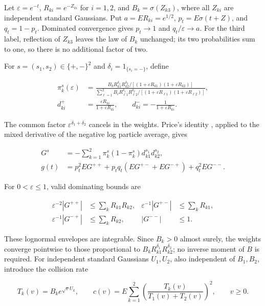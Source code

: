 \documentclass{article}
\begin{document}
Let \(\varepsilon=e^{-t}\), \(R_{ki}=e^{-Z_{ki}}\) for \(i=1,2\), and
\(B_k=\sigma(Z_{k3})\), where all \(Z_{ki}\) are independent standard
Gaussians. Put \(a=ER_{ki}=e^{1/2}\), \(p_t=E\sigma(t+Z)\), and
\(q_t=1-p_t\). Dominated convergence gives \(p_t\to1\) and
\(q_t/\varepsilon\to a\). For the third label, reflection of \(Z_{k3}\)
leaves the law of \(B_k\) unchanged; its two probabilities sum to one,
so there is no additional factor of two.

For \(s=(s_1,s_2)\in\{+,-\}^2\) and \(\delta_i=1_{\{s_i=-\}}\), define

\[
\begin{aligned}
\pi_k^s(\varepsilon)&=
\frac{B_kR_{k1}^{\delta_1}R_{k2}^{\delta_2}/[(1+\varepsilon R_{k1})(1+\varepsilon R_{k2})]}
{\sum_{\ell=1}^2B_\ell R_{\ell1}^{\delta_1}R_{\ell2}^{\delta_2}/[(1+\varepsilon R_{\ell1})(1+\varepsilon R_{\ell2})]},\\
d_{ki}^+&=\frac{\varepsilon R_{ki}}{1+\varepsilon R_{ki}},\qquad
 d_{ki}^-=-\frac1{1+\varepsilon R_{ki}}.
\end{aligned}
\tag{G.3}
\]

The common factor \(\varepsilon^{\delta_1+\delta_2}\) cancels in the
weights. Price's identity \citep{price1958}, applied to the mixed
derivative of the negative log particle average, gives

\[
\begin{aligned}
G^s&=-\sum_{k=1}^2\pi_k^s(1-\pi_k^s)d_{k1}^{s_1}d_{k2}^{s_2},\\
g(t)&=p_t^2EG^{++}+p_tq_t(EG^{+-}+EG^{-+})+q_t^2EG^{--}.
\end{aligned}
\tag{G.4}
\]

For \(0<\varepsilon\le1\), valid dominating bounds are

\[
\begin{aligned}
\varepsilon^{-2}|G^{++}|&\le\sum_kR_{k1}R_{k2},&
\varepsilon^{-1}|G^{+-}|&\le\sum_kR_{k1},\\
\varepsilon^{-1}|G^{-+}|&\le\sum_kR_{k2},&
|G^{--}|&\le1.
\end{aligned}
\tag{G.5}
\]

These lognormal envelopes are integrable. Since \(B_k>0\) almost surely,
the weights converge pointwise to those proportional to
\(B_kR_{k1}^{\delta_1}R_{k2}^{\delta_2}\); no inverse moment of \(B\) is
required. For independent standard Gaussians \(U_1,U_2\), also
independent of \(B_1,B_2\), introduce the collision rate

\[
T_k(v)=B_ke^{\sqrt vU_k},\qquad
c(v)=E\sum_{k=1}^2\left(\frac{T_k(v)}{T_1(v)+T_2(v)}\right)^2,
\qquad v\ge0.
\tag{G.6}
\]
\end{document}
